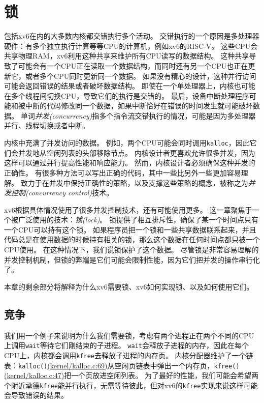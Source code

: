 \chapter{锁}\label{ch06}

包括xv6在内的大多数内核都交错执行多个活动。
交错执行的一个原因是多处理器硬件：有多个独立执行计算等等CPU的计算机，例如xv6的RISC-V。
这些CPU会共享物理RAM，xv6利用这种共享来维护所有CPU读写的数据结构。
这种共享导致了可能会有一个CPU正在读取一个数据结构，而同时还有另一个CPU也正在更新它，或者多个CPU同时更新同一个数据。
如果没有精心的设计，这种并行访问可能会返回错误的结果或者破坏数据结构。
即使在一个单处理器上，内核也可能在多个线程间切换CPU，导致它们的执行是交错的。
最后，设备中断处理程序可能和被中断的代码修改同一个数据，如果中断恰好在错误的时间发生就可能破坏数据。
单词\emph{并发(concurrency)}指多个指令流交错执行的情况，可能是因为多处理器并行、线程切换或者中断。

内核中充满了并发访问的数据。
例如，两个CPU可能会同时调用\texttt{kalloc}，因此它们会并发地从空闲列表的头部移除节点。
内核设计者更喜欢允许很多并发，因为这样可以通过并行提高性能和响应能力。
然而，内核设计者必须确保这种并发的正确性。
有很多种方法可以写出正确的代码，其中一些比另外一些更加容易理解。
致力于在并发中保持正确性的策略，以及支撑这些策略的概念，被称之为\emph{并发控制(concurrency control)}技术。

xv6根据具体情况使用了很多并发控制技术，还有可能使用更多。
这一章聚焦于一个被广泛使用的技术：\emph{锁(lock)}。
锁提供了相互排斥性，确保了某一个时间点只有一个CPU可以持有这个锁。
如果程序员把一个锁和一些共享数据联系起来，并且代码总是在使用数据的时候持有相关的锁，那么这个数据在任何时间点都只被一个CPU使用。
在这种情况下，我们说锁保护了这个数据。
尽管锁是非常容易理解的并发控制机制，但锁的弊端是它们可能会限制性能，因为它们把并发的操作串行化了。

本章的剩余部分将解释为什么xv6需要锁、xv6如何实现锁、以及如何使用它们。

\section{竞争}
我们用一个例子来说明为什么我们需要锁，考虑有两个进程正在两个不同的CPU上调用\texttt{wait}等待它们刚结束的子进程。
\texttt{wait}会释放子进程的内存，因此在每个CPU上，内核都会调用\texttt{kfree}去释放子进程的内存页。
内核分配器维护了一个链表：\texttt{kalloc()}\href{https://github.com/mit-pdos/xv6-riscv/blob/riscv//kernel/kalloc.c#L69}{(kernel/kalloc.c:69)}从空闲页链表中弹出一个内存页，\texttt{kfree()}\href{https://github.com/mit-pdos/xv6-riscv/blob/riscv//kernel/kalloc.c#L47}{(kernel/kalloc.c:47)}把一个页放进空闲列表。
为了最好的性能，我们可能会希望两个附近承德\texttt{kfree}能并行执行，无需等待彼此，但对xv6的\texttt{kfree}实现来说这样可能会导致错误的结果。

